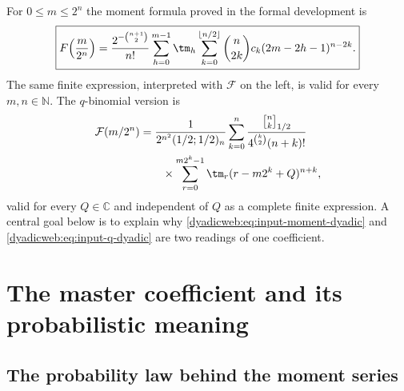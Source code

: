 \documentclass[11pt,oneside]{article}
\theoremstyle{definition}
\theoremstyle{remark}
\newcommand{\C}{\mathbb C}
\newcommand{\N}{\mathbb N}
\newcommand{\qbinom}[3]{\genfrac{[}{]}{0pt}{}{#1}{#2}_{#3}}
\begin{document}
For $0\le m\le2^n$ the moment formula proved in the formal development is
\begin{equation}
 \boxed{
 F\!\left(\frac{m}{2^n}\right)
 =\frac{2^{-\binom{n+1}{2}}}{n!}
 \sum_{h=0}^{m-1}\tm_h
 \sum_{k=0}^{\lfloor n/2\rfloor}
 \binom n{2k}c_k(2m-2h-1)^{n-2k}.}                        \label{dyadicweb:eq:input-moment-dyadic}
\end{equation}
The same finite expression, interpreted with $\mathcal F$ on the left, is valid for every
$m,n\in\N$.  The $q$-binomial version is
\begin{align}
 \mathcal F(m/2^n)
 &=\frac{1}{2^{n^2}(1/2;1/2)_n}
 \sum_{k=0}^{n}
 \frac{\qbinom nk{1/2}}{4^{\binom k2}(n+k)!}             \notag\\
 &\qquad\times
 \sum_{r=0}^{m2^k-1}\tm_r(r-m2^k+Q)^{n+k},               \label{dyadicweb:eq:input-q-dyadic}
\end{align}
valid for every $Q\in\C$ and independent of $Q$ as a complete finite expression.  A central
goal below is to explain why \eqref{dyadicweb:eq:input-moment-dyadic} and
\eqref{dyadicweb:eq:input-q-dyadic} are two readings of one coefficient.

\section{The master coefficient and its probabilistic meaning}
\label{dyadicweb:sec:master}

\subsection{The probability law behind the moment series}
\end{document}
